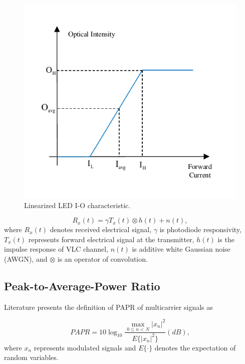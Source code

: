 \documentclass[9pt,twocolumn,twoside]{osajnl}
\begin{document}
\begin{figure}[t]
  \centering
  \includegraphics[width=\linewidth]{figures/LED_IO.pdf}
  \caption{Linearized LED I-O characteristic.}
  \label{fig:LEDIO}
\end{figure}

\begin{equation}
  R_x(t)= \gamma T_x(t) \otimes h(t) + n(t),
  \label{eq:channelResponse}
\end{equation}
where $R_x(t)$ denotes received electrical signal, $\gamma$ is photodiode responsivity, $T_x(t)$ 
represents forward electrical signal at the transmitter, $h(t)$ is the impulse response of VLC channel, 
$n(t)$ is additive white Gaussian noise (AWGN), and $\otimes$ is an operator of convolution. 

\subsection{Peak-to-Average-Power Ratio}

Literature \cite{tellado2006multicarrier} presents the definition of PAPR 
of multicarrier signals as

\begin{equation}
  PAPR=10\log_{10}{\frac{\max\limits_{0 \leq n < N}{{|x_n|}^2}}{E\{{|x_n|}^2\}}} (dB),
  \label{eq:PAPR}
\end{equation}
where $x_n$ represents modulated signals and $E\{\cdot\}$ denotes the expectation of random variables.
\end{document}

